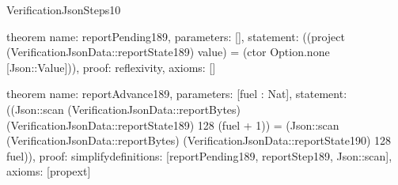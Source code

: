 \begin{lexlean}{VerificationJsonSteps10}
\begin{semanticmodule}
theorem{
  name: reportPending189,
  parameters: [],
  statement: ((project (VerificationJsonData::reportState189) value) = (ctor Option.none [Json::Value])),
  proof: reflexivity{},
  axioms: []
}

theorem{
  name: reportAdvance189,
  parameters: [fuel : Nat],
  statement: ((Json::scan (VerificationJsonData::reportBytes) (VerificationJsonData::reportState189) 128 (fuel + 1)) = (Json::scan (VerificationJsonData::reportBytes) (VerificationJsonData::reportState190) 128 fuel)),
  proof: simplify{definitions: [reportPending189, reportStep189, Json::scan]},
  axioms: [propext]
}

\end{semanticmodule}
\end{lexlean}
